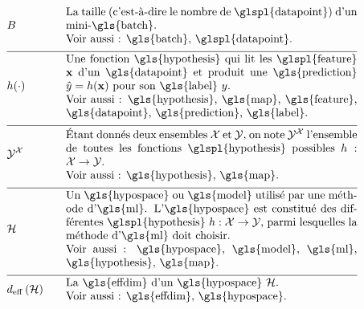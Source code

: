 \begin{align}
	& \batchsize & \quad & \parbox{.75\textwidth}{La taille (c’est-à-dire le nombre de \glspl{datapoint}) d’un mini-\gls{batch}. \\ Voir aussi : \gls{batch}, \glspl{datapoint}.} \nonumber \\[2mm] \hline \nonumber\\[-5mm]
	& \hypothesis(\cdot) & \quad & \parbox{.75\textwidth}{Une fonction \gls{hypothesis} qui lit les \glspl{feature} $\featurevec$ d’un \gls{datapoint} et produit une \gls{prediction} $\hat{\truelabel}=\hypothesis(\featurevec)$ pour son \gls{label} $\truelabel$. \\ Voir aussi : \gls{hypothesis}, \gls{map}, \gls{feature}, \gls{datapoint}, \gls{prediction}, \gls{label}.} \nonumber \\[2mm] \hline \nonumber\\[-5mm]
	& \labelspace^{\featurespace} & \quad & \parbox{.75\textwidth}{Étant donnés deux ensembles $\featurespace$ et $\labelspace$, on note $\labelspace^{\featurespace}$ l’ensemble de toutes les fonctions \glspl{hypothesis} possibles $\hypothesis: \featurespace \rightarrow \labelspace$. \\ Voir aussi : \gls{hypothesis}, \gls{map}.} \nonumber \\[2mm] \hline \nonumber\\[-5mm]
	& \hypospace & \quad & \parbox{.75\textwidth}{Un \gls{hypospace} ou \gls{model} utilisé par une méthode d’\gls{ml}. L'\gls{hypospace} est constitué des différentes \glspl{hypothesis} $\hypothesis: \featurespace \rightarrow \labelspace$, parmi lesquelles la méthode d’\gls{ml} doit choisir. \\ Voir aussi : \gls{hypospace}, \gls{model}, \gls{ml}, \gls{hypothesis}, \gls{map}.} \nonumber \\[2mm] \hline \nonumber\\[-5mm]
	& \effdim{\hypospace} & \quad & \parbox{.75\textwidth}{La \gls{effdim} d’un \gls{hypospace} $\hypospace$. \\ Voir aussi : \gls{effdim}, \gls{hypospace}.} \nonumber
\end{align}

